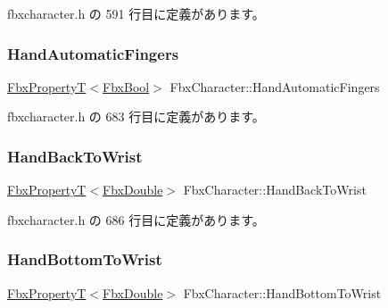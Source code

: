  fbxcharacter.\+h の 591 行目に定義があります。

\mbox{\label{class_fbx_character_a6023f3bc872c3541df2a7b32692742c1}} 
\subsubsection{\texorpdfstring{Hand\+Automatic\+Fingers}{HandAutomaticFingers}}
{\footnotesize\ttfamily \hyperlink{class_fbx_property_t}{Fbx\+PropertyT}$<$\hyperlink{fbxtypes_8h_a92e0562b2fe33e76a242f498b362262e}{Fbx\+Bool}$>$ Fbx\+Character\+::\+Hand\+Automatic\+Fingers}



 fbxcharacter.\+h の 683 行目に定義があります。

\mbox{\label{class_fbx_character_a953e4bda3fa81d951e4bd8a779bb2b92}} 
\subsubsection{\texorpdfstring{Hand\+Back\+To\+Wrist}{HandBackToWrist}}
{\footnotesize\ttfamily \hyperlink{class_fbx_property_t}{Fbx\+PropertyT}$<$\hyperlink{fbxtypes_8h_a171e72a1c46fc15c1a6c9c31948c1c5b}{Fbx\+Double}$>$ Fbx\+Character\+::\+Hand\+Back\+To\+Wrist}



 fbxcharacter.\+h の 686 行目に定義があります。

\mbox{\label{class_fbx_character_a2145fec76a2cfe6d16172b2fbf9d7a54}} 
\subsubsection{\texorpdfstring{Hand\+Bottom\+To\+Wrist}{HandBottomToWrist}}
{\footnotesize\ttfamily \hyperlink{class_fbx_property_t}{Fbx\+PropertyT}$<$\hyperlink{fbxtypes_8h_a171e72a1c46fc15c1a6c9c31948c1c5b}{Fbx\+Double}$>$ Fbx\+Character\+::\+Hand\+Bottom\+To\+Wrist}



